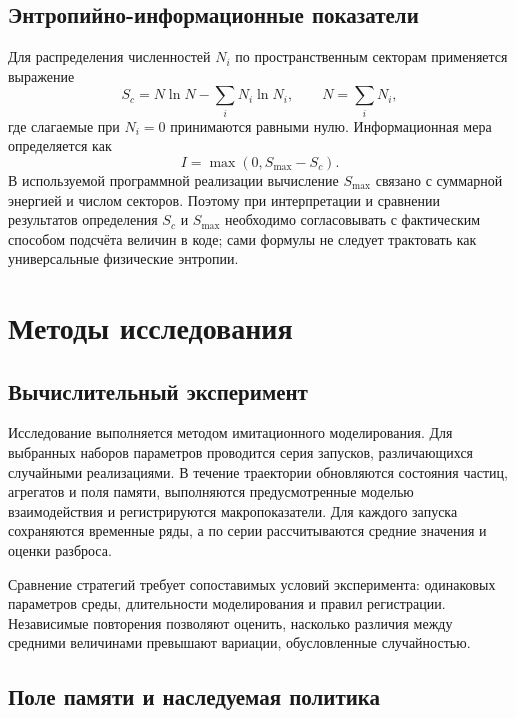 \documentclass{misisarticle}
\begin{document}
\subsection{Энтропийно-информационные показатели}

Для распределения численностей $N_i$ по пространственным секторам применяется выражение
\begin{equation}
  S_c=N\ln N-\sum_i N_i\ln N_i,\qquad
  N=\sum_i N_i,
  \label{eq:entropy}
\end{equation}
где слагаемые при $N_i=0$ принимаются равными нулю. Информационная мера определяется как
\begin{equation}
  I=\max(0,S_{\max}-S_c).
  \label{eq:information}
\end{equation}
В используемой программной реализации вычисление $S_{\max}$ связано с суммарной энергией и числом секторов. Поэтому при интерпретации и сравнении результатов определения $S_c$ и $S_{\max}$ необходимо согласовывать с фактическим способом подсчёта величин в коде; сами формулы не следует трактовать как универсальные физические энтропии.

\section{Методы исследования}

\subsection{Вычислительный эксперимент}

Исследование выполняется методом имитационного моделирования. Для выбранных наборов параметров проводится серия запусков, различающихся случайными реализациями. В течение траектории обновляются состояния частиц, агрегатов и поля памяти, выполняются предусмотренные моделью взаимодействия и регистрируются макропоказатели. Для каждого запуска сохраняются временные ряды, а по серии рассчитываются средние значения и оценки разброса.

Сравнение стратегий требует сопоставимых условий эксперимента: одинаковых параметров среды, длительности моделирования и правил регистрации. Независимые повторения позволяют оценить, насколько различия между средними величинами превышают вариации, обусловленные случайностью.

\subsection{Поле памяти и наследуемая политика}
\end{document}

